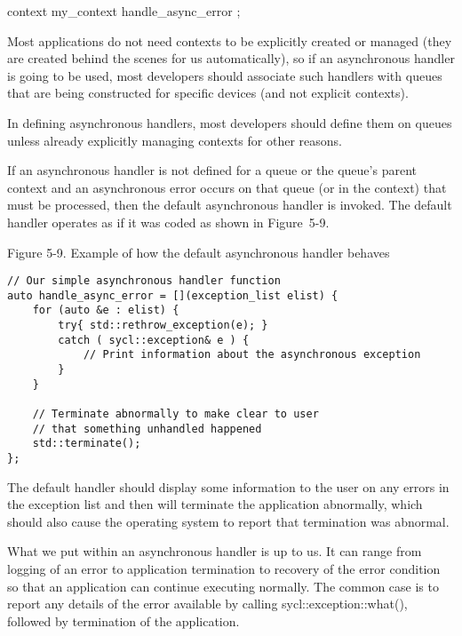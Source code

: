 context my\_context{ handle\_async\_error };\par

Most applications do not need contexts to be explicitly created or managed (they are created behind the scenes for us automatically), so if an asynchronous handler is going to be used, most developers should associate such handlers with queues that are being constructed for specific devices (and not explicit contexts).\par

\begin{tcolorbox}[colback=red!5!white,colframe=red!75!black]
In defining asynchronous handlers, most developers should define them on queues unless already explicitly managing contexts for other reasons.
\end{tcolorbox}

If an asynchronous handler is not defined for a queue or the queue’s parent context and an asynchronous error occurs on that queue (or in the context) that must be processed, then the default asynchronous handler is invoked. The default handler operates as if it was coded as shown in Figure 5-9.\par

\hspace*{\fill} \par %
Figure 5-9. Example of how the default asynchronous handler behaves
\begin{lstlisting}[caption={}]
// Our simple asynchronous handler function
auto handle_async_error = [](exception_list elist) {
	for (auto &e : elist) {
		try{ std::rethrow_exception(e); }
		catch ( sycl::exception& e ) {
			// Print information about the asynchronous exception
		}
	}

	// Terminate abnormally to make clear to user
	// that something unhandled happened
	std::terminate();
};
\end{lstlisting}

The default handler should display some information to the user on any errors in the exception list and then will terminate the application abnormally, which should also cause the operating system to report that termination was abnormal.\par

What we put within an asynchronous handler is up to us. It can range from logging of an error to application termination to recovery of the error condition so that an application can continue executing normally. The common case is to report any details of the error available by calling sycl::exception::what(), followed by termination of the application.\par

